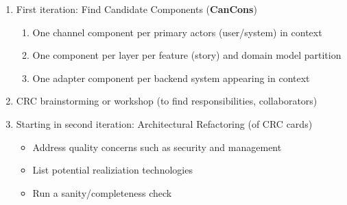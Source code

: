 \begin{enumerate}
	\item First iteration: Find Candidate Components (\textbf{CanCons})
	\begin{enumerate}
		\item One channel component per primary actors (user/system) in context
		\item One component per layer per feature (story) and domain model partition
		\item One adapter component per backend system appearing in context
	\end{enumerate}
	\item CRC brainstorming or workshop (to find responsibilities, collaborators)
	\item Starting in second iteration: Architectural Refactoring (of CRC cards)
	\begin{itemize}
		\item Address quality concerns such as security and management
		\item List potential realiziation technologies
		\item Run a sanity/completeness check
	\end{itemize}
\end{enumerate}



